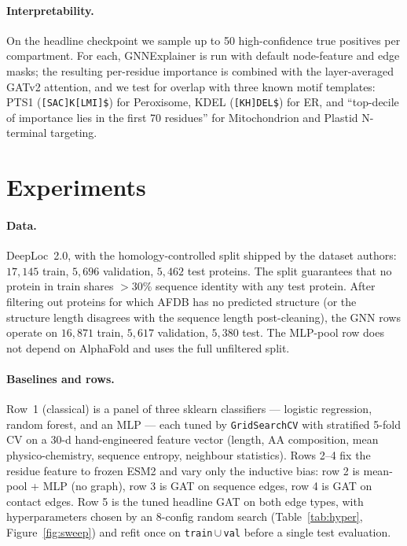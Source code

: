 \documentclass{article}
\begin{document}
\paragraph{Interpretability.}
On the headline checkpoint we sample up to 50 high-confidence true
positives per compartment. For each, GNNExplainer is run with default
node-feature and edge masks; the resulting per-residue importance is
combined with the layer-averaged GATv2 attention, and we test for
overlap with three known motif templates: PTS1 (\texttt{[SAC]K[LMI]\$})
for Peroxisome, KDEL (\texttt{[KH]DEL\$}) for ER, and ``top-decile of
importance lies in the first 70 residues'' for Mitochondrion and Plastid
N-terminal targeting.

\section{Experiments}\label{sec:experiments}

\paragraph{Data.}
DeepLoc~2.0, with the homology-controlled split shipped by the dataset
authors: $17{,}145$ train, $5{,}696$ validation, $5{,}462$ test
proteins. The split guarantees that no protein in train shares
$>30\%$ sequence identity with any test protein. After filtering out
proteins for which AFDB has no predicted structure (or the structure
length disagrees with the sequence length post-cleaning), the GNN rows
operate on $16{,}871$ train, $5{,}617$ validation, $5{,}380$ test.
The MLP-pool row does not depend on AlphaFold and uses the full
unfiltered split.

\paragraph{Baselines and rows.}
Row~1 (classical) is a panel of three sklearn classifiers --- logistic
regression, random forest, and an MLP --- each tuned by
\texttt{GridSearchCV} with stratified 5-fold CV on a 30-d
hand-engineered feature vector (length, AA composition, mean
physico-chemistry, sequence entropy, neighbour statistics). Rows 2--4
fix the residue feature to frozen ESM2 and vary only the inductive
bias: row 2 is mean-pool + MLP (no graph), row 3 is GAT on sequence
edges, row 4 is GAT on contact edges. Row 5 is the tuned headline GAT
on both edge types, with hyperparameters chosen by an 8-config random
search (Table~\ref{tab:hyper}, Figure~\ref{fig:sweep}) and refit once on
\texttt{train}\,$\cup$\,\texttt{val} before a single test evaluation.
\end{document}
